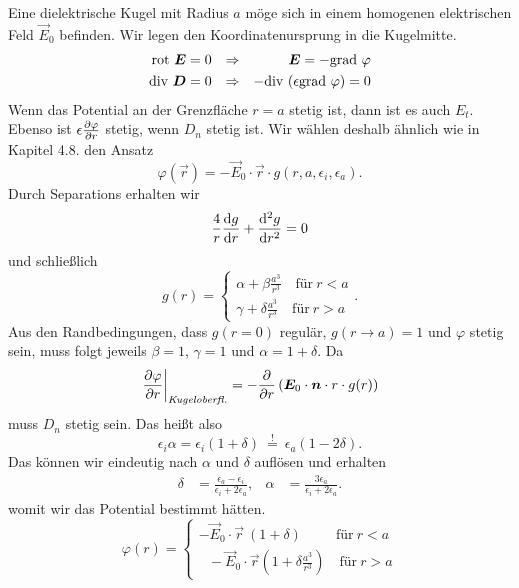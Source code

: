 Eine dielektrische Kugel mit Radius $a$ möge sich in einem homogenen elektrischen Feld $\vec{E}_0$ befinden. Wir legen den Koordinatenursprung in die Kugelmitte. 
\begin{align*}
\text{rot } \bm{E} &=0 &\Rightarrow & &\bm{E}=-\text{grad }\varphi\\
\text{div }\bm{D} &=0 &\Rightarrow& &-\text{div }(\epsilon\text{grad }\varphi)=0
\end{align*}
Wenn das Potential an der Grenzfläche $r=a$ stetig ist, dann ist es auch $E_t$. Ebenso ist $\epsilon\frac{\partial{\varphi}}{\partial{r}}$ stetig, wenn $D_n$ stetig ist. Wir wählen deshalb ähnlich wie in Kapitel 4.8. den Ansatz
\begin{equation*}
\varphi(\vec{r})=-\vec{E}_0\cdot\vec{r}\cdot g(r,a,\epsilon_i,\epsilon_a).
\end{equation*}
Durch Separations erhalten wir
\begin{equation*}
\frac{4}{r}\frac{\mathrm{d}{g}}{\mathrm{d}{r}}+\frac{\mathrm{d}^2{g}}{\mathrm{d}{r}^2}=0
\end{equation*}
und schließlich
\begin{equation*}
g(r)=\left\lbrace\begin{matrix}
\alpha + \beta\frac{a^3}{r^3} \quad\text{für}\ r<a\\
\gamma + \delta\frac{a^3}{r^3}\quad\text{für}\ r>a
\end{matrix}\right. .
\end{equation*}
Aus den Randbedingungen, dass $g(r=0)$ regulär, $g(r\rightarrow a)=1$ und $\varphi$ stetig sein, muss folgt jeweils $\beta=1$, $\gamma=1$ und $\alpha=1+\delta$. Da
\begin{equation*}
\left.\frac{\partial{\varphi}}{\partial{r}}\right|_\textit{Kugeloberfl.} = -\frac{\partial{}}{\partial{r}}\left(\bm{E}_0\cdot\bm{n}\cdot r\cdot g(r)\right)
\end{equation*}
muss $D_n$ stetig sein. Das heißt also
\begin{equation*}
\epsilon_i \alpha = \epsilon_i(1+\delta)\ \stackrel{!}{=}\ \epsilon_a(1-2\delta).
\end{equation*}
Das können wir eindeutig nach $\alpha$ und $\delta$ auflösen und erhalten
\begin{align*}
\delta & = \frac{\epsilon_a-\epsilon_i}{\epsilon_i+2\epsilon_a}, &\alpha&=\frac{3\epsilon_a}{\epsilon_i+2\epsilon_a}.
\end{align*}
womit wir das Potential bestimmt hätten.
\begin{equation*}
\varphi(r)=\left\lbrace\begin{matrix}
-\vec{E}_0\cdot\vec{r}\ (1+\delta) \qquad\ \ \text{für}\ r<a\\
\ \ \ -\vec{E}_0\cdot\vec{r}  (1+\delta\frac{a^3}{r^3})\quad\text{für}\ r>a
\end{matrix}\right. 
\end{equation*}
